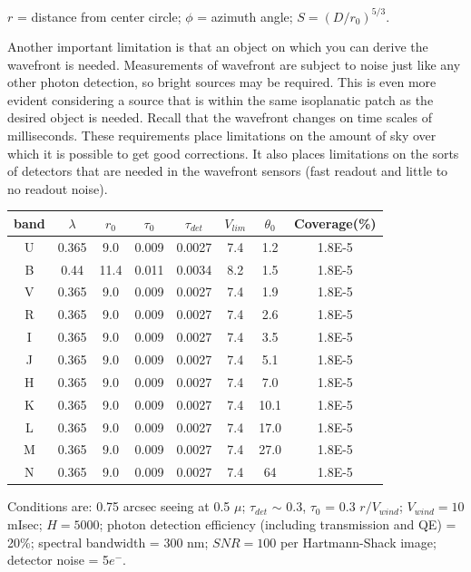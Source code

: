 \documentclass[12pt]{article}
\begin{document}
$r$ = distance from center circle;
$\phi$ = azimuth angle; $S=(D/r_0)^{5/3}$.

Another important limitation is that an object on which you
can derive the wavefront is needed. Measurements of wavefront are subject to
noise just like any other photon detection, so bright sources may be required.
This is even more evident considering a source that is within the same
isoplanatic patch as the desired object is needed.
Recall that the wavefront changes on time scales of milliseconds.
These requirements place limitations on the amount of
sky over which it is possible to get good corrections.
It also places limitations on the sorts of detectors that are needed
in the wavefront sensors (fast readout and little to no readout noise).

\begin{table}[th]
\centering
\begin{tabular}{c c c c c c c c}
    band & $\lambda$ & $r_0$ & $\tau_0$ & $\tau_{det}$ & $V_{lim}$ &
    $\theta_0$ & Coverage(\%)\\
    \hline\hline
    U & 0.365 & 9.0 & 0.009 & 0.0027 & 7.4 & 1.2 & 1.8E-5\\
    B & 0.44 & 11.4 & 0.011 & 0.0034 & 8.2 & 1.5 & 1.8E-5\\
    V & 0.365 & 9.0 & 0.009 & 0.0027 & 7.4 & 1.9 & 1.8E-5\\
    R & 0.365 & 9.0 & 0.009 & 0.0027 & 7.4 & 2.6 & 1.8E-5\\
    I & 0.365 & 9.0 & 0.009 & 0.0027 & 7.4 & 3.5 & 1.8E-5\\
    J & 0.365 & 9.0 & 0.009 & 0.0027 & 7.4 & 5.1 & 1.8E-5\\
    H & 0.365 & 9.0 & 0.009 & 0.0027 & 7.4 & 7.0 & 1.8E-5\\
    K & 0.365 & 9.0 & 0.009 & 0.0027 & 7.4 & 10.1 & 1.8E-5\\
    L & 0.365 & 9.0 & 0.009 & 0.0027 & 7.4 & 17.0 & 1.8E-5\\
    M & 0.365 & 9.0 & 0.009 & 0.0027 & 7.4 & 27.0 & 1.8E-5\\
    N & 0.365 & 9.0 & 0.009 & 0.0027 & 7.4 & 64 & 1.8E-5\\
    \hline
    \end{tabular}
\end{table}

Conditions are: 0.75 arcsec seeing at 0.5 $\mu$; $ \tau_{det}$
$\sim$ 0.3, $\tau_0$ = 0.3 $r/V_{wind}$; $V_{wind}=10$ mIsec; $H=5000$;
photon detection efficiency (including transmission and QE) = 20\%;
spectral bandwidth = 300 nm; $SNR=100$ per Hartmann-Shack image;
detector noise = 5$e^{-}$.
\end{document}
